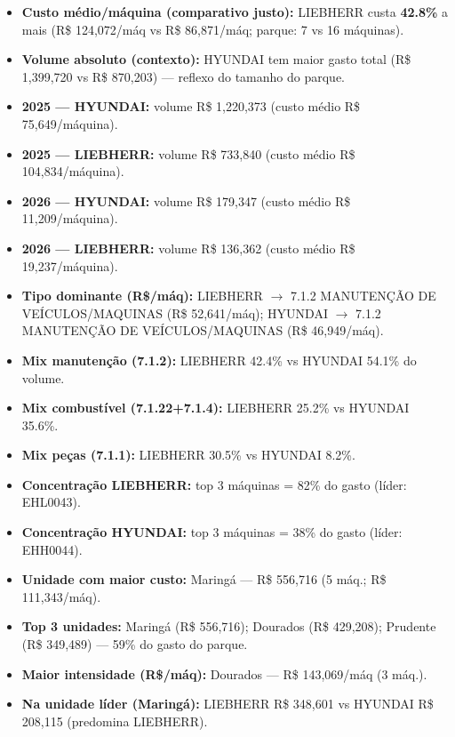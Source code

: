 \begin{itemize}[leftmargin=*]
  \setlength{\itemsep}{0.35em}
  \item \textbf{Custo médio/máquina (comparativo justo):} LIEBHERR custa \textbf{42.8\%} a mais (R\$ 124,072/máq vs R\$ 86,871/máq; parque: 7 vs 16 máquinas).
  \item \textbf{Volume absoluto (contexto):} HYUNDAI tem maior gasto total (R\$ 1,399,720 vs R\$ 870,203) — reflexo do tamanho do parque.
  \item \textbf{2025 — HYUNDAI:} volume R\$ 1,220,373 (custo médio R\$ 75,649/máquina).
  \item \textbf{2025 — LIEBHERR:} volume R\$ 733,840 (custo médio R\$ 104,834/máquina).
  \item \textbf{2026 — HYUNDAI:} volume R\$ 179,347 (custo médio R\$ 11,209/máquina).
  \item \textbf{2026 — LIEBHERR:} volume R\$ 136,362 (custo médio R\$ 19,237/máquina).
  \item \textbf{Tipo dominante (R\$/máq):} LIEBHERR $\rightarrow$ 7.1.2 MANUTENÇÃO DE VEÍCULOS/MAQUINAS (R\$ 52,641/máq); HYUNDAI $\rightarrow$ 7.1.2 MANUTENÇÃO DE VEÍCULOS/MAQUINAS (R\$ 46,949/máq).
  \item \textbf{Mix manutenção (7.1.2):} LIEBHERR 42.4\% vs HYUNDAI 54.1\% do volume.
  \item \textbf{Mix combustível (7.1.22+7.1.4):} LIEBHERR 25.2\% vs HYUNDAI 35.6\%.
  \item \textbf{Mix peças (7.1.1):} LIEBHERR 30.5\% vs HYUNDAI 8.2\%.
  \item \textbf{Concentração LIEBHERR:} top 3 máquinas = 82\% do gasto (líder: EHL0043).
  \item \textbf{Concentração HYUNDAI:} top 3 máquinas = 38\% do gasto (líder: EHH0044).
  \item \textbf{Unidade com maior custo:} Maringá — R\$ 556,716 (5 máq.; R\$ 111,343/máq).
  \item \textbf{Top 3 unidades:} Maringá (R\$ 556,716); Dourados (R\$ 429,208); Prudente (R\$ 349,489) — 59\% do gasto do parque.
  \item \textbf{Maior intensidade (R\$/máq):} Dourados — R\$ 143,069/máq (3 máq.).
  \item \textbf{Na unidade líder (Maringá):} LIEBHERR R\$ 348,601 vs HYUNDAI R\$ 208,115 (predomina LIEBHERR).
\end{itemize}
